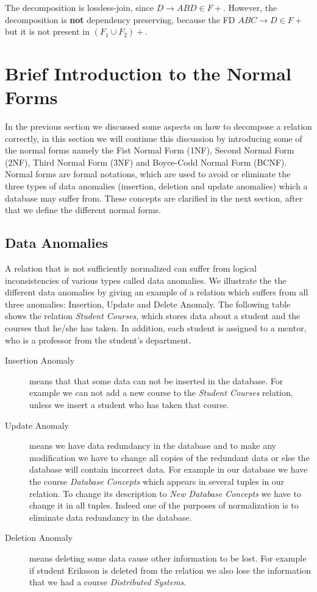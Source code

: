 The decomposition is lossless-join, since $D \rightarrow ABD \in F+$. However, 
the decomposition is \textbf{not} dependency preserving, because the FD $ABC \rightarrow D \in F+$ but it is
not present in $(F_1 \cup F_2) +$.

\section{Brief Introduction to the Normal Forms}
\label{sec:nfintro}
In the previous section we discussed some aspects on how to decompose a relation correctly, 
in this section we will continue this discussion by introducing some of the normal forms
namely the Fist Normal Form (1NF), Second Normal Form (2NF), Third Normal Form (3NF) and
Boyce-Codd Normal Form (BCNF). Normal forms are formal
notations, which are used to avoid or eliminate the three types of data anomalies 
(insertion, deletion and update anomalies) which a database may suffer from. 
These concepts are clarified in the next section, after that we
define the different normal forms.

\subsection{Data Anomalies}
A relation that is not sufficiently normalized can suffer from logical inconsistencies of various types
called data anomalies. We illustrate the the different data anomalies by
giving an example of a relation which suffers from all three anomalies: Insertion, Update and
Delete Anomaly. The following table
shows the relation \textit{Student Courses}, which stores data about a student and the courses 
that he/she has taken. In addition, each student is assigned to a mentor, who is 
a professor from the student's department. 

\bgroup
\setlength\LTleft{-2cm}\setlength\LTright{-2cm}%
\egroup

\begin{description}
  \item[Insertion Anomaly] means that that some data can not be 
    inserted in the database. For example we can not add a new course to the \textit{Student Courses}
    relation, unless we insert a student who has taken that course.
  \item[Update Anomaly] means we have data redundancy in the database and to make any 
    modification we have to change all copies of the redundant data or else the 
    database will contain incorrect data. For example in our database we have the course 
    \textit{Database Concepts} which appears in several tuples in our relation. 
    To change its description to \textit{New Database Concepts} we have to change 
    it in all tuples. Indeed one of the purposes of normalization is to eliminate data 
    redundancy in the database.
  \item[Deletion Anomaly] means deleting some data cause other information to be lost. 
    For example if student Eriksson is deleted from the relation we also lose the 
    information that we had a course \textit{Distributed Systems}.
\end{description}

